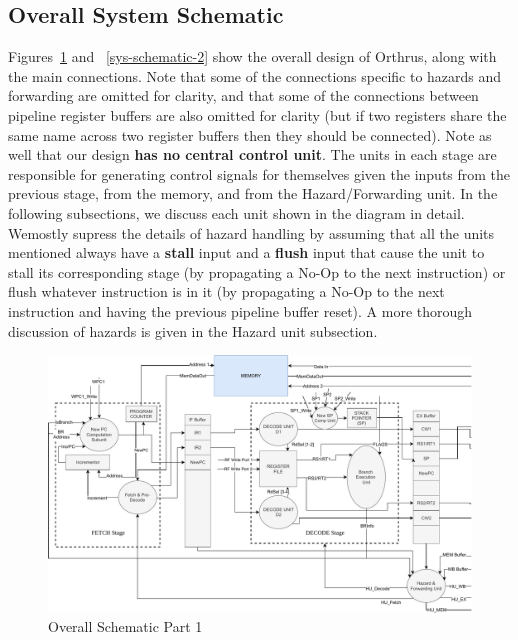 \documentclass[12pt]{article}
\theoremstyle{plain}
\theoremstyle{definition}
\begin{document}
\subsection{Overall System Schematic}
Figures~\ref{sys-schematic-1} and ~\ref{sys-schematic-2} show the overall design of Orthrus, along with the main connections. Note that some of the connections specific to hazards and forwarding are omitted for clarity, and that some of the connections between pipeline register buffers are also omitted for clarity (but if two registers share the same name across two register buffers then they should be connected). Note as well that our design \textbf{has no central control unit}. The units in each stage are responsible for generating control signals for themselves given the inputs from the previous stage, from the memory, and from the Hazard/Forwarding unit. In the following subsections, we discuss each unit shown in the diagram in detail. Wemostly supress the details of hazard handling by assuming that all the units mentioned always have a \textbf{stall} input and a \textbf{flush} input that cause the unit to stall its corresponding stage (by propagating a No-Op to the next instruction) or flush whatever instruction is in it (by propagating a No-Op to the next instruction and having the previous pipeline buffer reset). A more thorough discussion of hazards is given in the Hazard unit subsection.
    \begin{figure}
        \centering
        \includegraphics[page=1]{Diagrams/SystemOverviewSplit}
        \caption{Overall Schematic Part 1}
        \label{sys-schematic-1}
    \end{figure}
\end{document}
